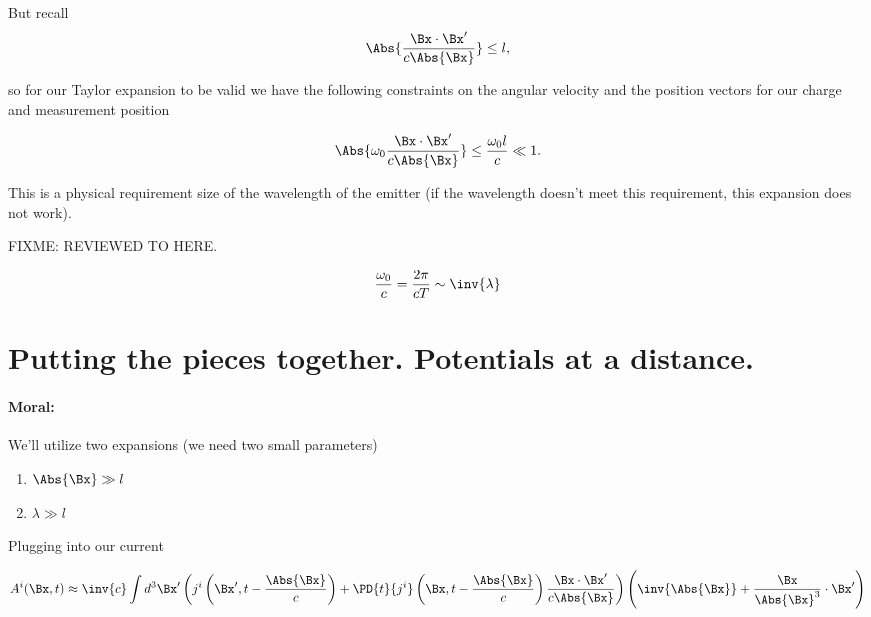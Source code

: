 But recall 
\begin{equation}\label{eqn:relativisticElectrodynamicsL20:130}
\Abs{\frac{\Bx \cdot \Bx'}{c \Abs{\Bx}}} \le l,
\end{equation}

so for our Taylor expansion to be valid we have the following constraints on the angular velocity and the position vectors for our charge and measurement position

\begin{equation}\label{eqn:relativisticElectrodynamicsL20:150}
\Abs{\omega_0 \frac{\Bx \cdot \Bx'}{c \Abs{\Bx}}} \le \frac{\omega_0 l}{c} \ll 1.
\end{equation}

This is a physical requirement size of the wavelength of the emitter (if the wavelength doesn't meet this requirement, this expansion does not work).

FIXME: REVIEWED TO HERE.

\begin{equation}\label{eqn:relativisticElectrodynamicsL20:170}
\frac{\omega_0}{c} = \frac{2 \pi}{c T} \sim \inv{\lambda}
\end{equation}

\section{Putting the pieces together.  Potentials at a distance.}

\paragraph{Moral:} We'll utilize two expansions (we need two small parameters)

\begin{enumerate}
\item $\Abs{\Bx} \gg l$
\item $\lambda \gg l$
\end{enumerate}

Plugging into our current

\begin{equation}\label{eqn:relativisticElectrodynamicsL20:190}
A^i(\Bx, t) 
\approx \inv{c} \int d^3 \Bx' 
\left( j^i\left(\Bx', t - \frac{\Abs{\Bx}}{c}\right) + \PD{t}{j^i} \left(\Bx, t - \frac{\Abs{\Bx}}{c}\right) \frac{\Bx \cdot \Bx'}{c \Abs{\Bx}} \right)
\left( \inv{\Abs{\Bx}} + \frac{\Bx}{\Abs{\Bx}^3} \cdot \Bx' \right)
\end{equation}

